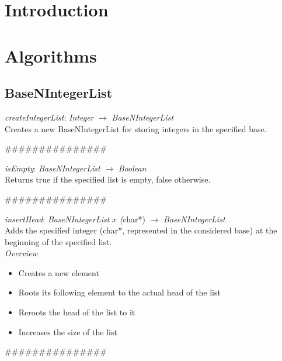 \documentclass[backcover, english, report, nodocumentinfo]{upmethodology-document}
\newcommand{\nxtalgo}{\centerline{$$$$\#\#\#\#\#\#\#\#\#\#\#\#\#\#\#$$$$}}
\newcommand{\ov}{\emph{Overview}}
\begin{document}
\tableofcontents

\chapter{Introduction}
\chapter{Algorithms}
	\section{BaseNIntegerList}

		\begin{minipage}{\linewidth}
			\emph{createIntegerList}: \emph{Integer} \(\rightarrow\) \emph{BaseNIntegerList}\\
				Creates a new BaseNIntegerList for storing integers in the specified base.
			\label{algo:BNIL-CreateIntegerList}
			
		\end{minipage}
		\nxtalgo

		\begin{minipage}{\linewidth}
			\emph{isEmpty}: \emph{BaseNIntegerList} \(\rightarrow\) \emph{Boolean}\\
				Returns true if the specified list is empty, false otherwise.
			\label{algo:BNIL-IsEmpty}
			
		\end{minipage}
		\nxtalgo

		\begin{minipage}{\linewidth}
			\emph{insertHead}: \emph{BaseNIntegerList} \(x\) \emph(char*) \(\rightarrow\) \emph{BaseNIntegerList}\\
				Adds the specified integer (char*, represented in the considered base) at the beginning of the specified list.\\
			\ov
			\begin{itemize}
				\item Creates a new element
				\item Roots its following element to the actual head of the list
				\item Reroots the head of the list to it
				\item Increases the size of the list
			\end{itemize}
			\label{algo:BNIL-InsertHead}
			
		\end{minipage}
		\nxtalgo
\end{document}

